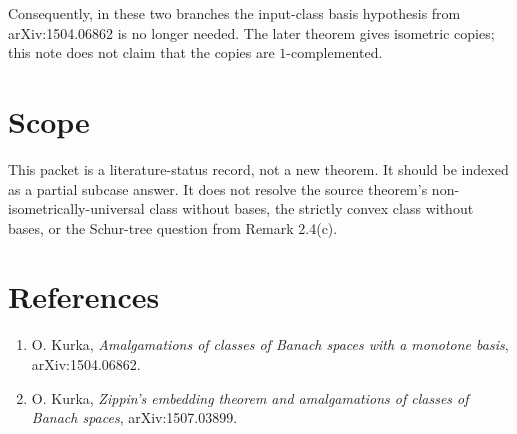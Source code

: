 \documentclass[11pt]{article}
\begin{document}
Consequently, in these two branches the input-class basis hypothesis from
arXiv:1504.06862 is no longer needed. The later theorem gives isometric copies;
this note does not claim that the copies are $1$-complemented.

\section*{Scope}

This packet is a literature-status record, not a new theorem. It should be
indexed as a partial subcase answer. It does not resolve the source theorem's
non-isometrically-universal class without bases, the strictly convex class
without bases, or the Schur-tree question from Remark 2.4(c).

\section*{References}

\begin{enumerate}
\item O. Kurka, \emph{Amalgamations of classes of Banach spaces with a
monotone basis}, arXiv:1504.06862.
\item O. Kurka, \emph{Zippin's embedding theorem and amalgamations of classes
of Banach spaces}, arXiv:1507.03899.
\end{enumerate}
\end{document}

